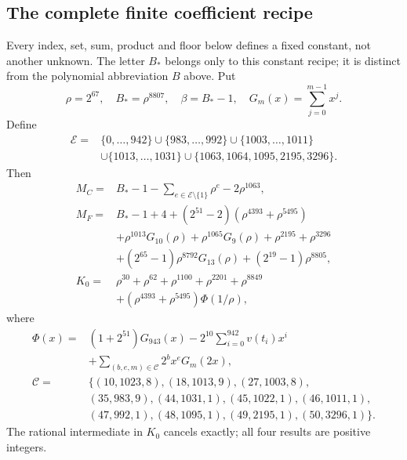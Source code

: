 \begingroup
\newcommand{\cfl}[1]{\left\lfloor#1\right\rfloor}
\newcommand{\crange}[2]{\{#1,\ldots,#2\}}
\subsection{The complete finite coefficient recipe}
Every index, set, sum, product and floor below defines a fixed constant, not
another unknown. The letter $B_\ast$ belongs only to this constant recipe;
it is distinct from the polynomial abbreviation $B$ above. Put
\[
\rho=2^{67},\quad B_\ast=\rho^{8807},\quad\beta=B_\ast-1,\quad
G_m(x)=\sum_{j=0}^{m-1}x^j.
\]
Define
\[
\begin{split}
\mathcal E={}&\crange0{942}\cup\crange{983}{992}\cup\crange{1003}{1011}\\
&\cup\crange{1013}{1031}\cup\{1063,1064,1095,2195,3296\}.
\end{split}
\]
Then
\begin{align*}
M_C={}&B_\ast-1-\sum_{e\in\mathcal E\setminus\{1\}}\rho^e-2\rho^{1063},\\
M_F={}&B_\ast-1+4+(2^{51}-2)(\rho^{4393}+\rho^{5495})\\
&+\rho^{1013}G_{10}(\rho)+\rho^{1065}G_9(\rho)
  +\rho^{2195}+\rho^{3296}\\
&+(2^{65}-1)\rho^{8792}G_{13}(\rho)+(2^{19}-1)\rho^{8805},\\
K_0={}&\rho^{30}+\rho^{62}+\rho^{1100}+\rho^{2201}+\rho^{8849}\\
&+(\rho^{4393}+\rho^{5495})\Phi(1/\rho),
\end{align*}
where
\[
\begin{split}
\Phi(x)={}&(1+2^{51})G_{943}(x)
 -2^{10}\sum_{i=0}^{942}v(t_i)x^i\\
&+\sum_{(b,e,m)\in\mathcal C}2^b x^e G_m(2x),\\
\mathcal C={}&\{(10,1023,8),(18,1013,9),(27,1003,8),\\
&(35,983,9),(44,1031,1),(45,1022,1),(46,1011,1),\\
&(47,992,1),(48,1095,1),(49,2195,1),(50,3296,1)\}.
\end{split}
\]
The rational intermediate in $K_0$ cancels exactly; all four results are positive integers.

